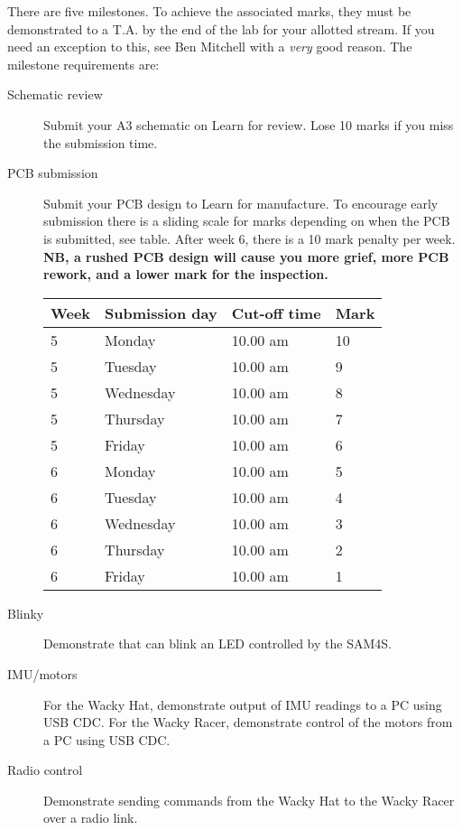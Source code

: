 \documentclass[11pt, a4paper]{article}
\begin{document}
There are five milestones.  To achieve the associated marks, they must
be demonstrated to a T.A. by the end of the lab for your allotted
stream.  If you need an exception to this, see Ben Mitchell with a
\emph{very} good reason.  The milestone requirements are:
%
\begin{description}
\item [Schematic review] Submit your A3 schematic on Learn for
  review.  Lose 10 marks if you miss the submission time.

\item [PCB submission] Submit your PCB design to Learn for
  manufacture.  To encourage early submission there is a sliding scale
  for marks depending on when the PCB is submitted, see table.  After
  week 6, there is a 10 mark penalty per week.  \textbf{NB, a rushed
    PCB design will cause you more grief, more PCB rework, and a lower
    mark for the inspection.}

  \begin{tabular}{llll}
    Week & Submission day & Cut-off time  & Mark \\ \hline
    5    & Monday       & 10.00 am & 10 \\
    5    & Tuesday      & 10.00 am & 9 \\
    5    & Wednesday    & 10.00 am & 8 \\
    5    & Thursday     & 10.00 am & 7 \\
    5    & Friday       & 10.00 am & 6 \\
    6    & Monday       & 10.00 am & 5 \\
    6    & Tuesday      & 10.00 am & 4 \\
    6    & Wednesday    & 10.00 am & 3 \\
    6    & Thursday     & 10.00 am & 2 \\
    6    & Friday       & 10.00 am & 1  \\
  \end{tabular}

\item [Blinky] Demonstrate that can blink an LED controlled by the SAM4S.

\item [IMU/motors] For the Wacky Hat, demonstrate output of IMU
  readings to a PC using USB CDC.  For the Wacky Racer, demonstrate
  control of the motors from a PC using USB CDC.

\item[Radio control] Demonstrate sending commands from the Wacky Hat
  to the Wacky Racer over a radio link.
\end{description}
\end{document}
